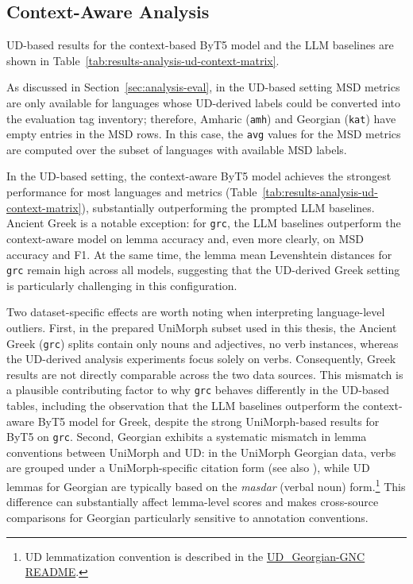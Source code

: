 \subsection{Context-Aware Analysis}

UD-based results for the context-based ByT5 model and the LLM baselines are shown in Table~\ref{tab:results-analysis-ud-context-matrix}.


As discussed in Section~\ref{sec:analysis-eval}, in the UD-based setting \ac{MSD} metrics are only available for languages whose UD-derived labels could be converted into the evaluation tag inventory; therefore, Amharic (\texttt{amh}) and Georgian (\texttt{kat}) have empty entries in the \ac{MSD} rows. In this case, the \texttt{avg} values for the \ac{MSD} metrics are computed over the subset of languages with available \ac{MSD} labels.

In the UD-based setting, the context-aware ByT5 model achieves the strongest performance for most languages and metrics (Table~\ref{tab:results-analysis-ud-context-matrix}), substantially outperforming the prompted LLM baselines. Ancient Greek is a notable exception: for \texttt{grc}, the LLM baselines outperform the context-aware model on lemma accuracy and, even more clearly, on \ac{MSD} accuracy and F1. At the same time, the lemma mean Levenshtein distances for \texttt{grc} remain high across all models, suggesting that the UD-derived Greek setting is particularly challenging in this configuration.

Two dataset-specific effects are worth noting when interpreting language-level outliers. First, in the prepared UniMorph subset used in this thesis, the Ancient Greek (\texttt{grc}) splits contain only nouns and adjectives, no verb instances, whereas the UD-derived analysis experiments focus solely on verbs. Consequently, Greek results are not directly comparable across the two data sources. This mismatch is a plausible contributing factor to why \texttt{grc} behaves differently in the UD-based tables, including the observation that the LLM baselines outperform the context-aware ByT5 model for Greek, despite the strong UniMorph-based results for ByT5 on \texttt{grc}. Second, Georgian exhibits a systematic mismatch in lemma conventions between UniMorph and UD: in the UniMorph Georgian data, verbs are grouped under a UniMorph-specific citation form (see also \parencite{guriel-etal-2022-morphological}), while UD lemmas for Georgian are typically based on the \textit{masdar} (verbal noun) form.\footnote{UD lemmatization convention is described in the \href{https://github.com/UniversalDependencies/UD_Georgian-GNC/blob/master/README.md}{UD\_Georgian-GNC README}.} This difference can substantially affect lemma-level scores and makes cross-source comparisons for Georgian particularly sensitive to annotation conventions.

